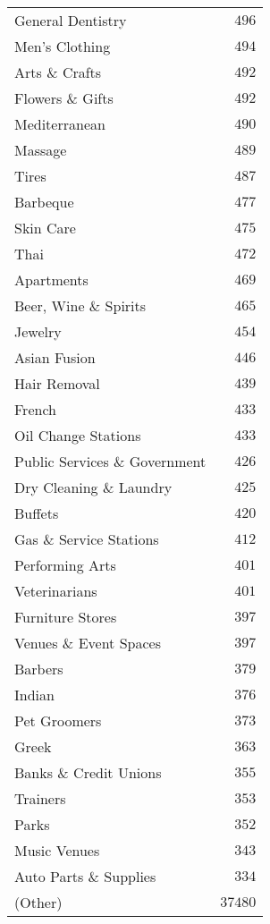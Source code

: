 \begin{table}[!tbp]
\begin{center}
\begin{tabular}{lr}
General Dentistry&$  496$\tabularnewline
Men's Clothing&$  494$\tabularnewline
Arts \& Crafts&$  492$\tabularnewline
Flowers \& Gifts&$  492$\tabularnewline
Mediterranean&$  490$\tabularnewline
Massage&$  489$\tabularnewline
Tires&$  487$\tabularnewline
Barbeque&$  477$\tabularnewline
Skin Care&$  475$\tabularnewline
Thai&$  472$\tabularnewline
Apartments&$  469$\tabularnewline
Beer, Wine \& Spirits&$  465$\tabularnewline
Jewelry&$  454$\tabularnewline
Asian Fusion&$  446$\tabularnewline
Hair Removal&$  439$\tabularnewline
French&$  433$\tabularnewline
Oil Change Stations&$  433$\tabularnewline
Public Services \& Government&$  426$\tabularnewline
Dry Cleaning \& Laundry&$  425$\tabularnewline
Buffets&$  420$\tabularnewline
Gas \& Service Stations&$  412$\tabularnewline
Performing Arts&$  401$\tabularnewline
Veterinarians&$  401$\tabularnewline
Furniture Stores&$  397$\tabularnewline
Venues \& Event Spaces&$  397$\tabularnewline
Barbers&$  379$\tabularnewline
Indian&$  376$\tabularnewline
Pet Groomers&$  373$\tabularnewline
Greek&$  363$\tabularnewline
Banks \& Credit Unions&$  355$\tabularnewline
Trainers&$  353$\tabularnewline
Parks&$  352$\tabularnewline
Music Venues&$  343$\tabularnewline
Auto Parts \& Supplies&$  334$\tabularnewline
(Other)&$37480$\tabularnewline
\hline
\end{tabular}\end{center}

\end{table}
